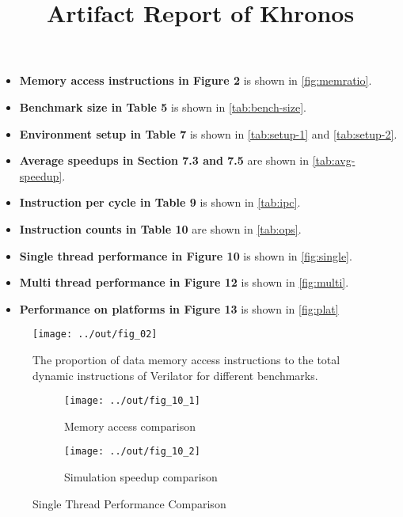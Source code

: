 \documentclass{sig-alternate}
\title{Artifact Report of Khronos}
\begin{document}
\maketitle

\begin{itemize}[noitemsep,topsep=0pt]
  \item {\bf Memory access instructions in Figure 2} is shown in \autoref{fig:memratio}.
  \item {\bf Benchmark size in Table 5} is shown in \autoref{tab:bench-size}.
  \item {\bf Environment setup in Table 7} is shown in \autoref{tab:setup-1} and \autoref{tab:setup-2}.
  \item {\bf Average speedups in Section 7.3 and 7.5} are shown in \autoref{tab:avg-speedup}.
  \item {\bf Instruction per cycle in Table 9} is shown in \autoref{tab:ipc}.
  \item {\bf Instruction counts in Table 10} are shown in \autoref{tab:ops}.
  \item {\bf Single thread performance in Figure 10} is shown in \autoref{fig:single}.
  \item {\bf Multi thread performance in Figure 12} is shown in \autoref{fig:multi}.
  \item {\bf Performance on platforms in Figure 13} is shown in \autoref{fig:plat}
\end{itemize}

\begin{figure}[h!]
  \centering
  \texttt{[image: ../out/fig\_02]}
  \vspace*{-4mm}
  \caption{The proportion of data memory access instructions to the total dynamic instructions of Verilator for different benchmarks.}
  \label{fig:memratio}
\end{figure}









\begin{figure*}[h!]
  \centering
  \begin{subfigure}{\linewidth}
    \centering
    \caption{Memory access comparison}
    \texttt{[image: ../out/fig\_10\_1]}
  \end{subfigure}
  \begin{subfigure}{\linewidth}
    \centering
    \caption{Simulation speedup comparison}
    \texttt{[image: ../out/fig\_10\_2]}
  \end{subfigure}
  \vspace*{-5mm}
  \caption{Single Thread Performance Comparison}
  \label{fig:single}
\end{figure*}
\end{document}
